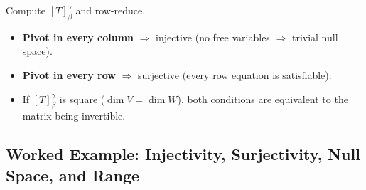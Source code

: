\documentclass[11pt, a4paper, notitlepage]{report}
\theoremstyle{definition}
\theoremstyle{remark}
\begin{document}
\begin{examtip}[title={Exam Tip: Injectivity and Surjectivity from the RREF}]
Compute $[T]_\beta^\gamma$ and row-reduce.
\begin{itemize}
  \item \textbf{Pivot in every column} $\Rightarrow$ injective (no free variables $\Rightarrow$ trivial null space).
  \item \textbf{Pivot in every row} $\Rightarrow$ surjective (every row equation is satisfiable).
  \item If $[T]_\beta^\gamma$ is square ($\dim V = \dim W$), both conditions are equivalent to
        the matrix being invertible.
\end{itemize}
\end{examtip}

\subsection{Worked Example: Injectivity, Surjectivity, Null Space, and Range}
\end{document}
